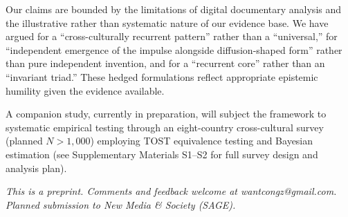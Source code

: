 \documentclass[12pt]{article}
\begin{document}
Our claims are bounded by the limitations of digital documentary analysis and the illustrative rather than systematic nature of our evidence base. We have argued for a ``cross-culturally recurrent pattern'' rather than a ``universal,'' for ``independent emergence of the impulse alongside diffusion-shaped form'' rather than pure independent invention, and for a ``recurrent core'' rather than an ``invariant triad.'' These hedged formulations reflect appropriate epistemic humility given the evidence available.

A companion study, currently in preparation, will subject the framework to systematic empirical testing through an eight-country cross-cultural survey (planned $N > 1{,}000$) employing TOST equivalence testing and Bayesian estimation (see Supplementary Materials S1--S2 for full survey design and analysis plan).

\medskip
\noindent\emph{This is a preprint. Comments and feedback welcome at wantcongz@gmail.com.}\\
\noindent\emph{Planned submission to New Media \& Society (SAGE).}
\end{document}
